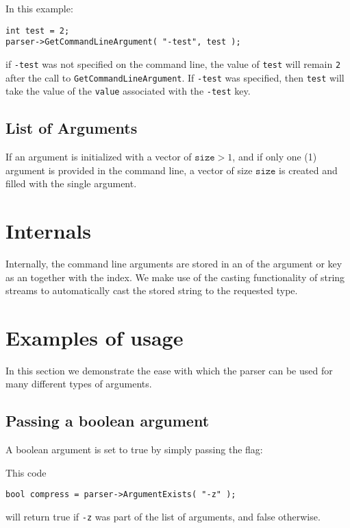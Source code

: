 \documentclass{InsightArticle}
\begin{document}
In this example:
\small
\begin{verbatim}
int test = 2;
parser->GetCommandLineArgument( "-test", test );
\end{verbatim}
\normalsize 

if \verb|-test| was not specified on the command line, the value of \verb|test| will remain \verb|2| after the call to \verb|GetCommandLineArgument|. If \verb|-test| was specified, then \verb|test| will take the value of the \verb|value| associated with the \verb|-test| key.

\subsection{List of Arguments}
If an argument is initialized with a vector of $\texttt{size} > 1$, and if
only one (1) argument is provided in the command line, a vector of
size $\texttt{size}$ is created and filled with the single argument.


\section{Internals}

Internally, the command line arguments are stored in an
 of the argument or key as an 
together with the index. We make use of the casting functionality of
string streams to automatically cast the stored string to the
requested type.


\section{Examples of usage}

In this section we demonstrate the ease with which the parser can be used for many different types of arguments.


\subsection{Passing a boolean argument}

A boolean argument is set to true by simply passing the flag:

\small{}\normalsize

This code \small
\begin{verbatim}
bool compress = parser->ArgumentExists( "-z" );
\end{verbatim}
\normalsize will return true if \texttt{-z} was part of the list of
arguments, and false otherwise.
\end{document}
